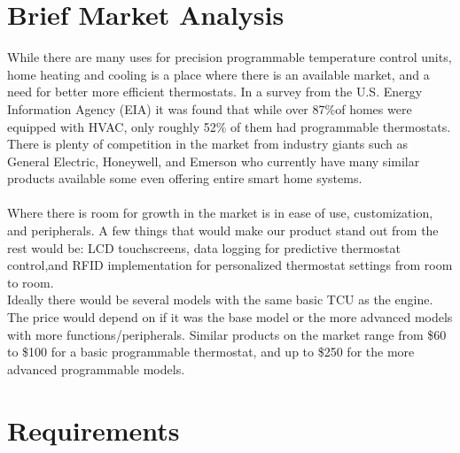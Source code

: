 \documentclass[11pt]{article}
\begin{document}
\section*{Brief Market Analysis} 

While there are many uses for precision programmable temperature control units, home heating and cooling is a place where there is an available market, and a need for better more efficient thermostats. In a survey from the U.S. Energy Information Agency (EIA) it was found that while over 87$\%$of homes were equipped with HVAC, only roughly 52$\%$ of them had programmable thermostats. There is plenty of competition in the market from industry giants such as General Electric, Honeywell, and Emerson who currently have many similar products available some even offering entire smart home systems.
\bigskip
\\
\bigskip
\\
Where there is room for growth in the market is in ease of use, customization, and peripherals. A few things that would make our product stand out from the rest would be: LCD touchscreens, data logging for predictive thermostat control,and RFID implementation for personalized thermostat settings from room to room.
\\
Ideally there would be several models with the same basic TCU as the engine. The price would depend on if it was the base model or the more advanced models with more functions/peripherals. Similar products on the market range from \$60 to \$100 for a basic programmable thermostat, and up to \$250 for the more advanced programmable models.


\section*{Requirements}
\end{document}
